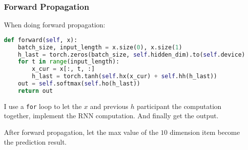 \subsubsection{Forward Propagation}

When doing forward propagation:

\begin{lstlisting}[language=Python]
def forward(self, x):
    batch_size, input_length = x.size(0), x.size(1)
    h_last = torch.zeros(batch_size, self.hidden_dim).to(self.device)
    for t in range(input_length):
        x_cur = x[:, t, :]
        h_last = torch.tanh(self.hx(x_cur) + self.hh(h_last))
    out = self.softmax(self.ho(h_last))
    return out
\end{lstlisting}

I use a \texttt{for} loop to let the $x$ and previous $h$ participant the computation together, implement the RNN computation. And finally get the output.

After forward propagation, let the max value of the $10$ dimension item become the prediction result. 
